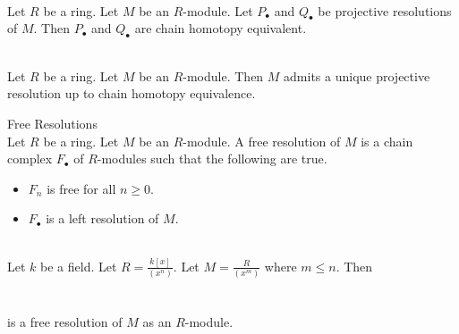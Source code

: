 \documentclass[a4paper]{article}
\begin{document}
\begin{crl}{}{}\\
Let $R$ be a ring. Let $M$ be an $R$-module. Let $P_\bullet$ and $Q_\bullet$ be projective resolutions of $M$. Then $P_\bullet$ and $Q_\bullet$ are chain homotopy equivalent. 
\end{crl}

\begin{prp}{}{}\\
Let $R$ be a ring. Let $M$ be an $R$-module. Then $M$ admits a unique projective resolution up to chain homotopy equivalence. 
\end{prp}

\begin{defn}{Free Resolutions}{}\\
Let $R$ be a ring. Let $M$ be an $R$-module. A free resolution of $M$ is a chain complex $F_\bullet$ of $R$-modules such that the following are true. 
\begin{itemize}
\item $F_n$ is free for all $n\geq 0$. 
\item $F_\bullet$ is a left resolution of $M$. 
\end{itemize}
\end{defn}

\begin{eg}{}{}\\
Let $k$ be a field. Let $R=\frac{k[x]}{(x^n)}$. Let $M=\frac{R}{(x^m)}$ where $m\leq n$. Then \\
\\~\\
is a free resolution of $M$ as an $R$-module. 
\end{eg}
\end{document}
